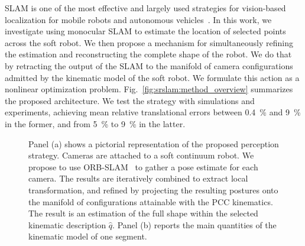 \gls{SLAM} is one of the most effective and largely used strategies for vision-based localization for mobile robots and autonomous vehicles~\cite{fuentes2015visual,mur2017orb}. %
%
In this work, we investigate using monocular \gls{SLAM} to estimate the location of selected points across the soft robot. We then propose a mechanism for simultaneously refining the estimation and reconstructing the complete shape of the robot. We do that by retracting the output of the \gls{SLAM} to the manifold of camera configurations admitted by the kinematic model of the soft robot. We formulate this action as a nonlinear optimization problem. Fig.~\ref{fig:srslam:method_overview} summarizes the proposed architecture. We test the strategy with simulations and experiments, achieving mean relative translational errors between \SI{0.4}{\percent} and \SI{9}{\percent} in the former, and from \SI{5}{\percent} to \SI{9}{\percent} in the latter.

\begin{figure}[ht]
     \centering
     \caption{ Panel (a) shows a pictorial representation of the proposed perception strategy. Cameras are attached to a soft continuum robot. We propose to use ORB-SLAM~\cite{mur2017orb} to gather a pose estimate for each camera. The results are iteratively combined to extract local transformation, and refined by projecting the resulting postures onto the manifold of configurations attainable with the \gls{PCC} kinematics. The result is an estimation of the full shape within the selected kinematic description $\hat{q}$. Panel (b) reports the main quantities of the kinematic model of one segment. }
\end{figure}